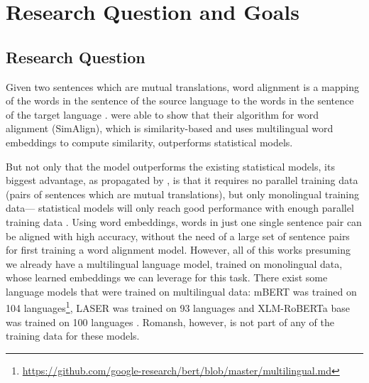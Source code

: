 


\section{Research Question and Goals}
\subsection{Research Question}\label{sec:research-question}
Given two sentences which are mutual translations, word alignment is a mapping of the words in the sentence of the source language to the words in the sentence of the target language \autocite[84]{koehn2009}.
\textcite{jalili-sabet-etal-2020-simalign} were able to show that their algorithm for word alignment (SimAlign), which is similarity-based and uses multilingual word embeddings to compute similarity, outperforms statistical models. 

But not only that the model outperforms the existing statistical models, its biggest advantage, as propagated by \textcite{jalili-sabet-etal-2020-simalign}, is that it requires no parallel training data (pairs of sentences which are mutual translations), but only monolingual training data--- 
statistical models will only reach good performance with enough parallel training data \autocites{jalili-sabet-etal-2020-simalign,och-ney-2000-improved}. 
Using word embeddings, words in just one single sentence pair can be aligned with high accuracy, without the need of a large set of sentence pairs for first training a word alignment model.
However, all of this works presuming we already have  a multilingual language model, trained on monolingual data, whose learned embeddings we can leverage for this task. 
There exist some language models that were trained on multilingual data: 
mBERT was trained on 104 languages\footnote{\url{https://github.com/google-research/bert/blob/master/multilingual.md}}, LASER was trained on 93 languages \autocite{artexte-schwenk-2019-laser} and XLM-RoBERTa base was trained on 100 languages \autocite{conneau-etal-2020-xlm}. Romansh, however, is not part of any of the training data for these models.



